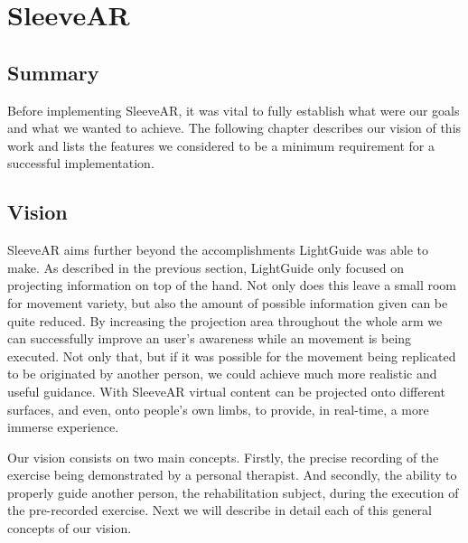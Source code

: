 \chapter{SleeveAR}
\label{sec:sleevear}

\section*{Summary}

Before implementing SleeveAR, it was vital to fully establish what were our goals and what we wanted to achieve. 
The following chapter describes our vision of this work and lists the features we considered to be a minimum requirement for a successful implementation.



\section{Vision}

SleeveAR aims further beyond the accomplishments LightGuide was able to make. 
As described in the previous section, LightGuide only focused on projecting information on top of the hand. Not only does this leave a small room for movement variety, but also the amount of possible information given can be quite reduced.
By increasing the projection area throughout the whole arm we can successfully improve an user's awareness while an movement is being executed. 
Not only that, but if it was possible for the movement being replicated to be originated by another person, we could achieve much more realistic and useful guidance.
With SleeveAR virtual content can be projected onto different surfaces, and even, onto people's own limbs, to provide, in real-time, a more immerse experience. 

Our vision consists on two main concepts. Firstly, the precise recording of the exercise being demonstrated by a personal therapist. 
And secondly, the ability to properly guide another person, the rehabilitation subject, during the execution of the pre-recorded exercise.
Next we will describe in detail each of this general concepts of our vision.


